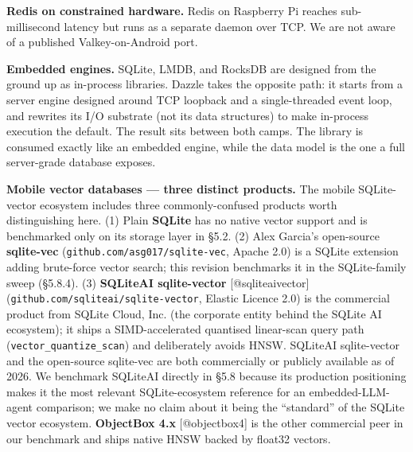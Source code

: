 \textbf{Redis on constrained hardware.} Redis on Raspberry Pi reaches
sub-millisecond latency but runs as a separate daemon over TCP. We are not aware
of a published Valkey-on-Android port.

\textbf{Embedded engines.} SQLite, LMDB, and RocksDB are designed from the
ground up as in-process libraries. Dazzle takes the opposite path: it starts
from a server engine designed around TCP loopback and a single-threaded event
loop, and rewrites its I/O substrate (not its data structures) to make
in-process execution the default. The result sits between both camps. The
library is consumed exactly like an embedded engine, while the data model is the
one a full server-grade database exposes.

\textbf{Mobile vector databases --- three distinct products.} The mobile
SQLite-vector ecosystem includes three commonly-confused products worth
distinguishing here. (1) Plain \textbf{SQLite} has no native vector support and
is benchmarked only on its storage layer in §5.2. (2) Alex Garcia's open-source
\textbf{sqlite-vec} (\texttt{github.com/asg017/sqlite-vec}, Apache 2.0) is a
SQLite extension adding brute-force vector search; this revision benchmarks it
in the SQLite-family sweep (§5.8.4). (3) \textbf{SQLiteAI sqlite-vector}
{[}@sqliteaivector{]} (\texttt{github.com/sqliteai/sqlite-vector}, Elastic
Licence 2.0) is the commercial product from SQLite Cloud, Inc. (the corporate
entity behind the SQLite AI ecosystem); it ships a SIMD-accelerated quantised
linear-scan query path (\texttt{vector\_quantize\_scan}) and deliberately avoids
HNSW. SQLiteAI sqlite-vector and the open-source sqlite-vec are both
commercially or publicly available as of 2026. We benchmark SQLiteAI directly in
§5.8 because its production positioning makes it the most relevant
SQLite-ecosystem reference for an embedded-LLM-agent comparison; we make no
claim about it being the ``standard'' of the SQLite vector ecosystem.
\textbf{ObjectBox 4.x} {[}@objectbox4{]} is the other commercial peer in our
benchmark and ships native HNSW backed by float32 vectors.

